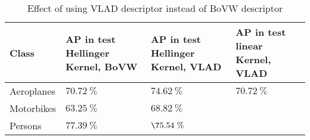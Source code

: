 \documentclass{article}
\begin{document}
\begin{table}[ht!]
	\centering
	\begin{tabular}{|l | p{3.5cm} | p{3.5cm}|}
		\hline
		Class      & AP in test Hellinger Kernel, BoVW & AP in test Hellinger Kernel, VLAD & AP in test linear Kernel, VLAD \\\hline\hline
		Aeroplanes & \(70.72~\%\)                      & \(74.62~\%\) & \(70.72~\%\)                     \\\hline
		Motorbikes & \(63.25~\%\)                      & \(68.82~\%\)                      \\\hline
		Persons    & \(77.39~\%\)                      & \(\75.54~\%\)                     \\\hline
	\end{tabular}
	\caption{Effect of using VLAD descriptor instead of BoVW descriptor}
	\label{tab_III2}
\end{table}
\end{document}
